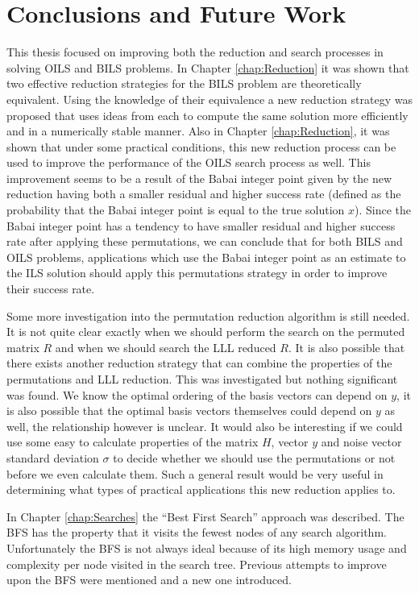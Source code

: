 \documentclass[12pt,Bold,letterpaper]{mcgilletdclass}
\begin{document}
\chapter{Conclusions and Future Work} \label{chap:Conclusion}

This thesis focused on improving both the reduction and search processes in solving OILS and BILS problems. In Chapter \ref{chap:Reduction} it was shown that two effective reduction strategies for the BILS problem are theoretically equivalent. Using the knowledge of their equivalence a new reduction strategy was proposed that uses ideas from each to compute the same solution more efficiently and in a numerically stable manner. Also in Chapter \ref{chap:Reduction}, it was shown that under some practical conditions, this new reduction process can be used to improve the performance of the OILS search process as well. This improvement seems to be a result of the Babai integer point given by the new reduction having both a smaller residual and higher success rate (defined as the probability that the Babai integer point is equal to the true solution $x$). Since the Babai integer point has a tendency to have smaller residual and higher success rate after applying these permutations, we can conclude that for both BILS and OILS problems, applications which use the Babai integer point as an estimate to the ILS solution should apply this permutations strategy in order to improve their success rate.

Some more investigation into the permutation reduction algorithm is still needed. It is not quite clear exactly when we should perform the search on the permuted matrix $R$ and when we should search the LLL reduced $R$. It is also possible that there exists another reduction strategy that can combine the properties of the permutations and LLL reduction. This was investigated but nothing significant was found. We know the optimal ordering of the basis vectors can depend on $y$, it is also possible that the optimal basis vectors themselves could depend on $y$ as well, the relationship however is unclear. It would also be interesting if we could use some easy to calculate properties of the matrix $H$, vector $y$ and noise vector standard deviation $\sigma$ to decide whether we should use the permutations or not before we even calculate them. Such a general result would be very useful in determining what types of practical applications this new reduction applies to.

In Chapter \ref{chap:Searches} the ``Best First Search'' approach was described. The BFS has the property that it visits the fewest nodes of any search algorithm. Unfortunately the BFS is not always ideal because of its high memory usage and complexity per node visited in the search tree. Previous attempts to improve upon the BFS were mentioned and a new one introduced. 
\end{document}
